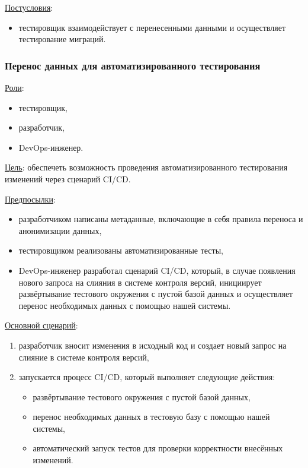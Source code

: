 \underline{Постусловия}:

\begin{itemize}
    \item тестировщик взаимодействует с перенесенными данными и осуществляет тестирование миграций.
\end{itemize}


\subsubsection{Перенос данных для автоматизированного тестирования}

\underline{Роли}:

\begin{itemize}
    \item тестировщик,
    \item разработчик,
    \item DevOps-инженер.
\end{itemize}

\underline{Цель}: обеспечеть возможность проведения автоматизированного тестирования изменений через сценарий CI/CD.

\underline{Предпосылки}:

\begin{itemize}
    \item разработчиком написаны метаданные, включающие в себя правила переноса и анонимизации данных,
    \item тестировщиком реализованы автоматизированные тесты,
    \item DevOps-инженер разработал сценарий CI/CD, который, в случае появления нового запроса на слияния в системе контроля версий, инициирует развёртывание тестового окружения с пустой базой данных и осуществляет перенос необходимых данных с помощью нашей системы.
\end{itemize}

\underline{Основной сценарий}:

\begin{enumerate}
    \item разработчик вносит изменения в исходный код и создает новый запрос на слияние в системе контроля версий,
    \item запускается процесс CI/CD, который выполняет следующие действия:
    \begin{itemize}
        \item развёртывание тестового окружения с пустой базой данных,
        \item перенос необходимых данных в тестовую базу с помощью нашей системы,
        \item автоматический запуск тестов для проверки корректности внесённых изменений.
    \end{itemize}
\end{enumerate}


